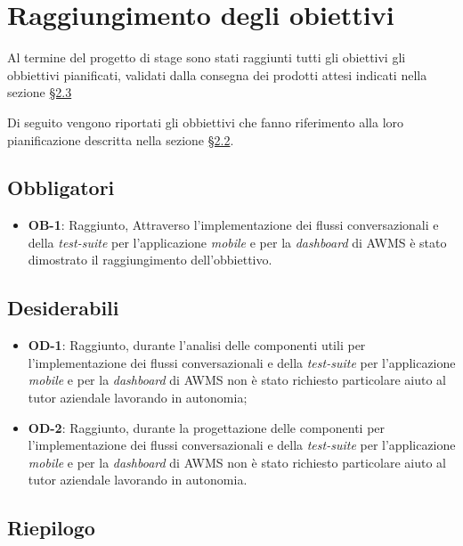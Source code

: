\section{Raggiungimento degli obiettivi}

Al termine del progetto di stage sono stati raggiunti tutti gli obiettivi gli obbiettivi pianificati, validati dalla consegna dei prodotti attesi indicati nella sezione \hyperref[cap:prodotti]{§2.3}

Di seguito vengono riportati gli obbiettivi che fanno riferimento alla loro pianificazione descritta nella sezione \hyperref[cap:obbiettivi]{§2.2}.

\subsection*{Obbligatori}
\begin{itemize}
	\item \textbf{OB-1}: Raggiunto, Attraverso l'implementazione dei flussi conversazionali e della \emph{test-suite} per l'applicazione \emph{mobile} e per la \emph{dashboard} di \gls{AWMS} è stato dimostrato il raggiungimento dell'obbiettivo.
\end{itemize}
\subsection*{Desiderabili} 
\begin{itemize}
	\item \textbf{OD-1}: Raggiunto, durante l'analisi delle componenti utili per l'implementazione dei flussi conversazionali e della \emph{test-suite} per l'applicazione \emph{mobile} e per la \emph{dashboard} di \gls{AWMS} non è stato richiesto particolare aiuto al tutor aziendale lavorando in autonomia;
	\item \textbf{OD-2}: Raggiunto, durante la progettazione delle componenti per l'implementazione dei flussi conversazionali e della \emph{test-suite} per l'applicazione \emph{mobile} e per la \emph{dashboard} di \gls{AWMS} non è stato richiesto particolare aiuto al tutor aziendale lavorando in autonomia.
\end{itemize}

\subsection{Riepilogo}

